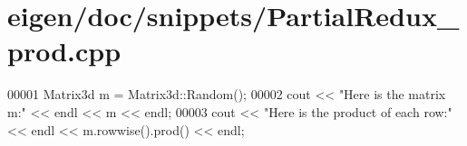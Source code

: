 \hypertarget{eigen_2doc_2snippets_2_partial_redux__prod_8cpp_source}{}\section{eigen/doc/snippets/\+Partial\+Redux\+\_\+prod.cpp}
\label{eigen_2doc_2snippets_2_partial_redux__prod_8cpp_source}

\begin{DoxyCode}
00001 Matrix3d m = Matrix3d::Random();
00002 cout << \textcolor{stringliteral}{"Here is the matrix m:"} << endl << m << endl;
00003 cout << \textcolor{stringliteral}{"Here is the product of each row:"} << endl << m.rowwise().prod() << endl;
\end{DoxyCode}
